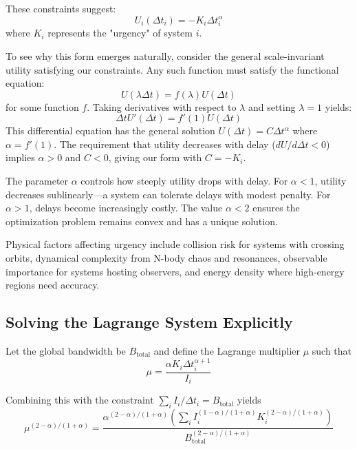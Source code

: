 \documentclass[twocolumn,prd,amsmath,amssymb,aps,superscriptaddress,nofootinbib]{revtex4-2}
\begin{document}
These constraints suggest:
\begin{equation}
U_i(\Delta t_i) = -K_i \Delta t_i^\alpha
\end{equation}
where $K_i$ represents the "urgency" of system $i$.

To see why this form emerges naturally, consider the general scale-invariant utility satisfying our constraints. Any such function must satisfy the functional equation:
\begin{equation}
U(\lambda \Delta t) = f(\lambda) U(\Delta t)
\end{equation}
for some function $f$. Taking derivatives with respect to $\lambda$ and setting $\lambda = 1$ yields:
\begin{equation}
\Delta t U'(\Delta t) = f'(1) U(\Delta t)
\end{equation}
This differential equation has the general solution $U(\Delta t) = C \Delta t^{\alpha}$ where $\alpha = f'(1)$. The requirement that utility decreases with delay ($dU/d\Delta t < 0$) implies $\alpha > 0$ and $C < 0$, giving our form with $C = -K_i$.

The parameter $\alpha$ controls how steeply utility drops with delay. For $\alpha < 1$, utility decreases sublinearly---a system can tolerate delays with modest penalty. For $\alpha > 1$, delays become increasingly costly. The value $\alpha < 2$ ensures the optimization problem remains convex and has a unique solution.

Physical factors affecting urgency include collision risk for systems with crossing orbits, dynamical complexity from N-body chaos and resonances, observable importance for systems hosting observers, and energy density where high-energy regions need accuracy.

\subsection{Solving the Lagrange System Explicitly}

Let the global bandwidth be $B_{\text{total}}$ and define the Lagrange multiplier $\mu$ such that
\begin{equation}
\mu = \frac{\alpha K_i \Delta t_i^{\alpha+1}}{I_i}
\end{equation}

Combining this with the constraint $\sum_i I_i / \Delta t_i = B_{\text{total}}$ yields
\begin{equation}
\mu^{(2-\alpha)/(1+\alpha)} = \frac{\alpha^{(2-\alpha)/(1+\alpha)} \left( \sum_i I_i^{(1-\alpha)/(1+\alpha)} K_i^{(2-\alpha)/(1+\alpha)} \right)}{B_{\text{total}}^{(2-\alpha)/(1+\alpha)}}
\end{equation}
\end{document}
